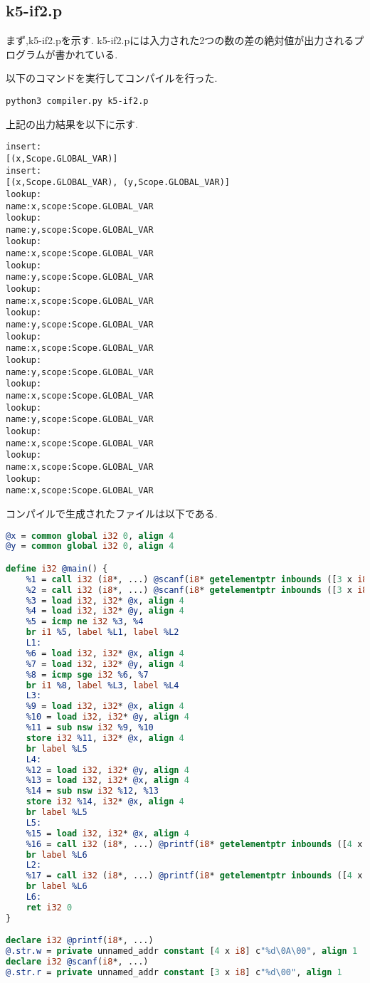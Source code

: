 \documentclass[main]{subfiles}
\begin{document}
\subsection{k5-if2.p}
まず,k5-if2.pを示す.
k5-if2.pには入力された2つの数の差の絶対値が出力されるプログラムが書かれている.

以下のコマンドを実行してコンパイルを行った.
\begin{oframed}
\begin{verbatim}
python3 compiler.py k5-if2.p
\end{verbatim}
\end{oframed}
上記の出力結果を以下に示す.
\begin{lstlisting}[caption=python3 compiler.py k5-if2.pの出力]
insert:
[(x,Scope.GLOBAL_VAR)]
insert:
[(x,Scope.GLOBAL_VAR), (y,Scope.GLOBAL_VAR)]
lookup:
name:x,scope:Scope.GLOBAL_VAR
lookup:
name:y,scope:Scope.GLOBAL_VAR
lookup:
name:x,scope:Scope.GLOBAL_VAR
lookup:
name:y,scope:Scope.GLOBAL_VAR
lookup:
name:x,scope:Scope.GLOBAL_VAR
lookup:
name:y,scope:Scope.GLOBAL_VAR
lookup:
name:x,scope:Scope.GLOBAL_VAR
lookup:
name:y,scope:Scope.GLOBAL_VAR
lookup:
name:x,scope:Scope.GLOBAL_VAR
lookup:
name:y,scope:Scope.GLOBAL_VAR
lookup:
name:x,scope:Scope.GLOBAL_VAR
lookup:
name:x,scope:Scope.GLOBAL_VAR
lookup:
name:x,scope:Scope.GLOBAL_VAR
\end{lstlisting}
コンパイルで生成されたファイルは以下である.
\begin{lstlisting}[caption=k5-if2.pのコンパイルで生成されたresult.ll,language=LLVM]
@x = common global i32 0, align 4
@y = common global i32 0, align 4

define i32 @main() {
    %1 = call i32 (i8*, ...) @scanf(i8* getelementptr inbounds ([3 x i8], [3 x i8]* @.str.r, i64 0, i64 0), i32* @x)
    %2 = call i32 (i8*, ...) @scanf(i8* getelementptr inbounds ([3 x i8], [3 x i8]* @.str.r, i64 0, i64 0), i32* @y)
    %3 = load i32, i32* @x, align 4
    %4 = load i32, i32* @y, align 4
    %5 = icmp ne i32 %3, %4
    br i1 %5, label %L1, label %L2
    L1:
    %6 = load i32, i32* @x, align 4
    %7 = load i32, i32* @y, align 4
    %8 = icmp sge i32 %6, %7
    br i1 %8, label %L3, label %L4
    L3:
    %9 = load i32, i32* @x, align 4
    %10 = load i32, i32* @y, align 4
    %11 = sub nsw i32 %9, %10
    store i32 %11, i32* @x, align 4
    br label %L5
    L4:
    %12 = load i32, i32* @y, align 4
    %13 = load i32, i32* @x, align 4
    %14 = sub nsw i32 %12, %13
    store i32 %14, i32* @x, align 4
    br label %L5
    L5:
    %15 = load i32, i32* @x, align 4
    %16 = call i32 (i8*, ...) @printf(i8* getelementptr inbounds ([4 x i8], [4 x i8]* @.str.w, i64 0, i64 0), i32 %15)
    br label %L6
    L2:
    %17 = call i32 (i8*, ...) @printf(i8* getelementptr inbounds ([4 x i8], [4 x i8]* @.str.w, i64 0, i64 0), i32 0)
    br label %L6
    L6:
    ret i32 0
}

declare i32 @printf(i8*, ...)
@.str.w = private unnamed_addr constant [4 x i8] c"%d\0A\00", align 1
declare i32 @scanf(i8*, ...)
@.str.r = private unnamed_addr constant [3 x i8] c"%d\00", align 1
\end{lstlisting}
\end{document}
